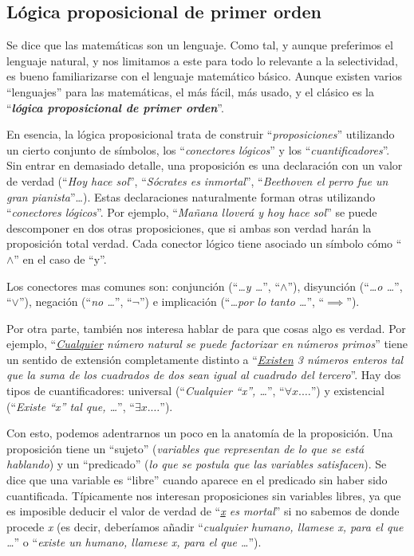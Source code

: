 \documentclass[10pt]{article}
\begin{document}
\subsection{Lógica proposicional de primer orden}

Se dice que las matemáticas son un lenguaje. Como tal, y aunque preferimos el lenguaje natural, y nos limitamos a este para todo lo relevante a la selectividad, es bueno familiarizarse con el lenguaje
matemático básico. Aunque existen varios ``lenguajes'' para las matemáticas, el más fácil, más usado, y el clásico es la ``\textbf{\textit{lógica proposicional de primer orden}}''.

En esencia, la lógica proposicional trata de construir ``\textit{proposiciones}'' utilizando un cierto conjunto de símbolos, los ``\textit{conectores lógicos}'' y los
``\textit{cuantificadores}''. Sin entrar en demasiado detalle, una proposición es una declaración con un valor de verdad (``\textit{Hoy hace sol}'', ``\textit{Sócrates es inmortal}'',
``\textit{Beethoven el perro fue un gran pianista}''\dots). Estas declaraciones naturalmente forman otras utilizando ``\textit{conectores lógicos}''. Por ejemplo, ``\textit{Mañana
lloverá y hoy hace sol}'' se puede descomponer en dos otras proposiciones, que si ambas son verdad harán la proposición total verdad. Cada conector lógico tiene asociado un símbolo
cómo ``$ \land $'' en el caso de ``y''.

Los conectores mas comunes son: conjunción (``\textit{\dots y \dots}'', ``$ \land $''), disyunción (``\textit{\dots o \dots}'', ``$ \lor $''), negación 
(``\textit{no \dots}'', ``$ \lnot $'') e implicación (``\textit{\dots por lo tanto \dots}'', ``$ \implies $'').

Por otra parte, también nos interesa hablar de para que cosas algo es verdad. Por ejemplo, ``\textit{\underline{Cualquier} número natural se puede factorizar en números primos}'' tiene un
sentido de extensión completamente distinto a ``\textit{\underline{Existen} 3 números enteros tal que la suma de los cuadrados de dos sean igual al cuadrado del tercero}''. Hay dos
tipos de cuantificadores: universal (``\textit{Cualquier ``x'', \dots}'', ``$ \forall x. \dots $'') y existencial (``\textit{Existe ``x'' tal que, \dots}'', ``$ \exists x. \dots $'').

Con esto, podemos adentrarnos un poco en la anatomía de la proposición. Una proposición tiene un ``sujeto'' (\textit{variables que representan de lo que se está hablando})
y un ``predicado'' (\textit{lo que se postula que las variables satisfacen}). Se dice que una variable es ``libre'' cuando aparece en el predicado sin haber sido cuantificada.
Típicamente nos interesan proposiciones sin variables libres, ya que es imposible deducir el valor de verdad de ``\textit{\underline{x} es mortal}'' si no sabemos de donde
procede \textit{x} (es decir, deberíamos añadir ``\textit{cualquier humano, llamese x, para el que \dots}'' o ``\textit{existe un humano, llamese x, para el que \dots}'').
\end{document}
